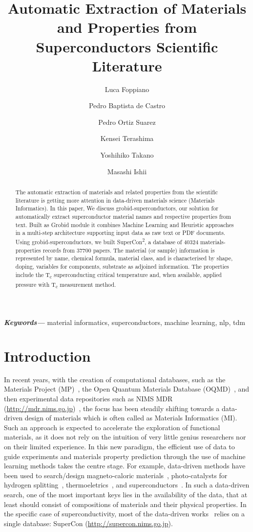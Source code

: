 \documentclass{article}
\title{Automatic Extraction of Materials and Properties from Superconductors Scientific Literature}
\author[1]{Luca Foppiano}
\author[2]{Pedro Baptista de Castro}
\author[3]{Pedro Ortiz Suarez}
\author[2]{Kensei Terashima}
\author[2]{Yoshihiko Takano}
\author[1]{Masashi Ishii}
\affil[1]{Material Database Group, MaDIS, NIMS, Tsukuba, Japan}
\affil[2]{Nano Frontier Superconducting Materials Group, MANA, NIMS, Tsukuba, Japan}
\affil[3]{Data and Web Science Group, University of Mannheim, Mannheim, Germany}
\providecommand{\keywords}[1]
{
  \small	
  \textbf{\textit{Keywords---}} #1
}
\begin{document}
\maketitle

\begin{abstract}
The automatic extraction of materials and related properties from the scientific literature is getting more attention in data-driven materials science (Materials Informatics). 
In this paper, We discuss grobid-superconductors, our solution for automatically extract superconductor material names and respective properties from text.
Built as Grobid module it combines Machine Learning and Heuristic approaches in a multi-step  architecture supporting input data as raw text or PDF documents. 
Using grobid-superconductors, we built SuperCon\textsuperscript{2}, a database of 40324 materials-properties records from 37700 papers. 
The material (or sample) information is represented by name, chemical formula, material class, and is characterised by shape, doping, variables for components, substrate as adjoined information.
The properties include the T\textsubscript{c} superconducting critical temperature and, when available, applied pressure with T\textsubscript{c} measurement method.
\end{abstract}

\keywords{material informatics, superconductors, machine learning, nlp, tdm}

\section{Introduction}
In recent years, with the creation of computational databases, such as the Materials Project (MP)~\cite{materialsprojectJain2013}, the Open Quantum Materials Database (OQMD)~\cite{oqmdkirklin2015open}, and then experimental data repositories such as NIMS MDR (\url{http://mdr.nims.go.jp})~\cite{ranganathan_anusha_2019_3553963}, the focus has been steadily shifting towards a data-driven design of materials which is often called as Materials Informatics (MI). 
Such an approach is expected to accelerate the exploration of functional materials, as it does not rely on the intuition of very little genius researchers nor on their limited experience.
In this new paradigm, the efficient use of data to guide experiments and materials property prediction through the use of machine learning methods takes the centre stage. 
For example, data-driven methods have been used to search/design magneto-caloric materials~\cite{Bocarsly2017,Castro2020-12,court2021inverse}, photo-catalysts for hydrogen splitting~\cite{xiong2021optimizing}, thermoeletrics~\cite{iwasaki2019machine}, and superconductors~\cite{stanev_machine_2017}. 
In such a data-driven search, one of the most important keys lies in the availability of the data, that at least should consist of compositions of materials and their physical properties. 
In the specific case of superconductivity, most of the data-driven works~\cite{stanev_machine_2017, le2020critical,Hamlin2019SuperconductivityNR} relies on a single database: SuperCon (\url{http://supercon.nims.go.jp}). 
\end{document}
